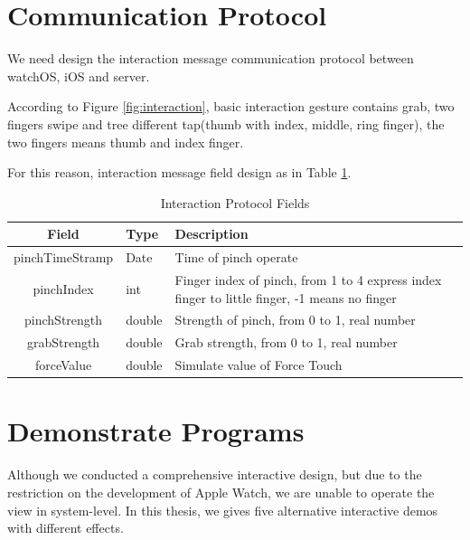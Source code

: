 \section{Communication Protocol}

We need design the interaction message communication protocol between watchOS, iOS and server.

According to Figure \ref{fig:interaction}, basic interaction gesture contains grab, two fingers swipe and tree different tap(thumb with index, middle, ring finger), the two fingers means thumb and index finger.

For this reason, interaction message field design as in Table \ref{table:server-feild}.

\begin{table}[H]
    \small
    \kaishu
    \centering
    \setlength{\belowcaptionskip}{10pt}
    \caption{Interaction Protocol Fields}
    \begin{tabular}{c l l}
        \toprule
        \textbf{Field}        & \textbf{Type} & \textbf{Description} \\
        \hline
        pinchTimeStramp & Date  & Time of pinch operate\\
        pinchIndex     & int    & Finger index of pinch, from 1 to 4 express index finger to little finger, -1 means no finger \\
        pinchStrength  & double & Strength of pinch, from 0 to 1, real number \\
        grabStrength   & double & Grab strength, from 0 to 1, real number \\
        forceValue     & double & Simulate value of Force Touch\\
        \bottomrule
    \end{tabular}

    \label{table:server-feild}
\end{table}

\section{Demonstrate Programs}

Although we conducted a comprehensive interactive design, but due to the restriction on the development of Apple Watch, we are unable to operate the view in system-level. In this thesis, we gives five alternative interactive demos with different effects.

